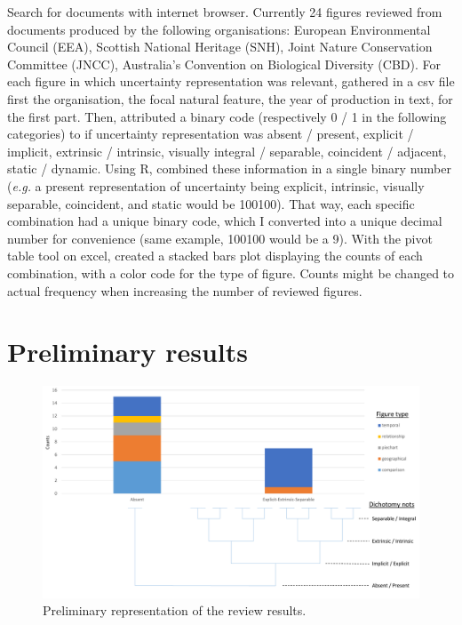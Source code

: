 \documentclass[12pt,a4paper,draft]{article}
\begin{document}
Search for documents with internet browser.
Currently 24 figures reviewed from documents produced by the following organisations: European Environmental Council (EEA), Scottish National Heritage (SNH), Joint Nature Conservation Committee (JNCC), Australia's Convention on Biological Diversity (CBD).
For each figure in which uncertainty representation was relevant, gathered in a csv file first the organisation, the focal natural feature, the year of production in text, for the first part.
Then, attributed a binary code (respectively 0 / 1 in the following categories) to if uncertainty representation was absent / present, explicit / implicit, extrinsic / intrinsic, visually integral / separable, coincident / adjacent, static / dynamic.
Using R, combined these information in a single binary number (\textit{e.g.} a present representation of uncertainty being explicit, intrinsic, visually separable, coincident, and static would be 100100).
That way, each specific combination had a unique binary code, which I converted into a unique decimal number for convenience (same example, 100100 would be a 9).
With the pivot table tool on excel, created a stacked bars plot displaying the counts of each combination, with a color code for the type of figure.
Counts might be changed to actual frequency when increasing the number of reviewed figures.

\section{Preliminary results}

\begin{figure}
\centering
\includegraphics[scale=0.25]{uncertainty_representation_review_fig.pdf}
\caption{Preliminary representation of the review results.}
\label{prelifig}
\end{figure}
\end{document}
